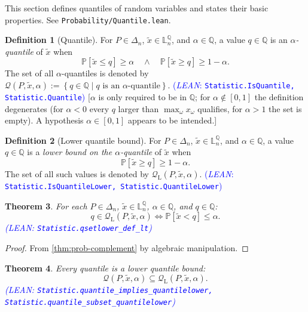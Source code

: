 \documentclass[letterpaper]{article}
\theoremstyle{plain}
\newtheorem{theorem}{Theorem}[subsection]
\theoremstyle{definition}
\newtheorem{definition}[theorem]{Definition}
\theoremstyle{remark}
\newcommand{\PP}{\mathbb{P}}
\newcommand{\cc}[1]{\textcolor{ccolor}{[#1]}}
\newcommand{\lean}[1]{\textcolor{blue}{(\emph{LEAN}: \texttt{#1})}}
\newcommand{\leanok}{}
\begin{document}
This section defines quantiles of random variables and states their basic properties. See \texttt{Probability/Quantile.lean}.

\begin{definition}[Quantile] \label{def:quantile}
For $P\in \Delta_n$, $\tilde{x}\in \mathbb{L}_n^{\mathbb{Q}}$, and $\alpha \in \mathbb{Q}$, a value $q\in \mathbb{Q}$ is an \emph{$\alpha$-quantile} of $\tilde{x}$ when
\[
  \PP\left[ \tilde{x} \le q \right] \ge \alpha
  \quad \wedge \quad
  \PP\left[ \tilde{x} \ge q \right] \ge 1 - \alpha.
\]
The set of all $\alpha$-quantiles is denoted by $\mathcal{Q}(P, \tilde{x}, \alpha) := \left\{ q\in \mathbb{Q} \mid q \text{ is an } \alpha\text{-quantile} \right\}$.
\lean{Statistic.IsQuantile, Statistic.Quantile} \leanok
\cc{$\alpha$ is only required to be in $\mathbb{Q}$; for $\alpha \notin [0,1]$ the definition degenerates (for $\alpha<0$ every $q$ larger than $\max_{\omega} x_{\omega}$ qualifies, for $\alpha>1$ the set is empty). A hypothesis $\alpha\in[0,1]$ appears to be intended.}
\end{definition}

\begin{definition}[Lower quantile bound] \label{def:quantile-lower}
For $P\in \Delta_n$, $\tilde{x}\in \mathbb{L}_n^{\mathbb{Q}}$, and $\alpha \in \mathbb{Q}$, a value $q\in \mathbb{Q}$ is a \emph{lower bound on the $\alpha$-quantile} of $\tilde{x}$ when
\[
  \PP\left[ \tilde{x} \ge q \right] \ge 1 - \alpha.
\]
The set of all such values is denoted by $\mathcal{Q}_{\mathrm{L}}(P, \tilde{x}, \alpha)$.
\lean{Statistic.IsQuantileLower, Statistic.QuantileLower} \leanok
\end{definition}

\begin{theorem} \label{thm:qsetlower-lt}
For each $P\in \Delta_n$, $\tilde{x}\in \mathbb{L}_n^{\mathbb{Q}}$, $\alpha\in \mathbb{Q}$, and $q\in \mathbb{Q}$:
\[
  q \in \mathcal{Q}_{\mathrm{L}}(P, \tilde{x}, \alpha)
  \iff
  \PP\left[ \tilde{x} < q \right] \le \alpha.
\]
\lean{Statistic.qsetlower\_def\_lt} \leanok
\end{theorem}
\begin{proof}
From \cref{thm:prob-complement} by algebraic manipulation.
\end{proof}

\begin{theorem} \label{thm:quantile-sub-lower}
Every quantile is a lower quantile bound:
\[
  \mathcal{Q}(P, \tilde{x}, \alpha) \subseteq \mathcal{Q}_{\mathrm{L}}(P, \tilde{x}, \alpha).
\]
\lean{Statistic.quantile\_implies\_quantilelower, Statistic.quantile\_subset\_quantilelower} \leanok
\end{theorem}
\end{document}
